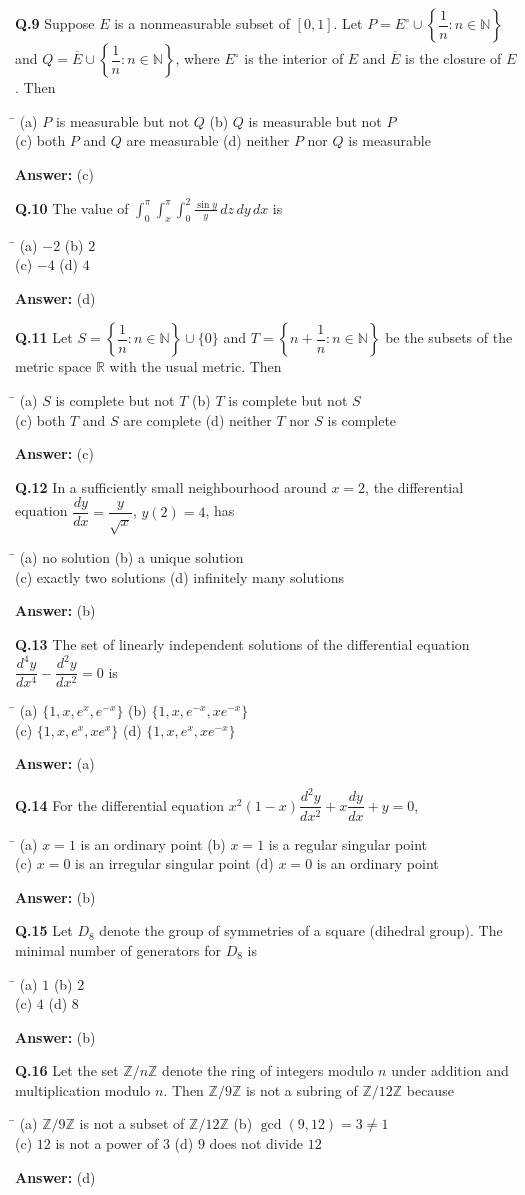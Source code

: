 \documentclass[11pt,a4paper]{article}
\newcommand{\optsfour}[4]{%
  \begin{tabbing}
    \hspace{0.48\linewidth}\=\kill
    (a) #1 \> (b) #2 \\[2pt]
    (c) #3 \> (d) #4
  \end{tabbing}%
}
\newcommand{\ans}[1]{\textbf{Answer:} #1\par\medskip}
\begin{document}
\textbf{Q.9} Suppose $E$ is a nonmeasurable subset of $[0, 1]$. Let $P = E^\circ \cup \left\{\dfrac{1}{n} : n \in \mathbb{N}\right\}$ and $Q = \overline{E} \cup \left\{\dfrac{1}{n} : n \in \mathbb{N}\right\}$, where $E^\circ$ is the interior of $E$ and $\overline{E}$ is the closure of $E$. Then
\optsfour{$P$ is measurable but not $Q$}{$Q$ is measurable but not $P$}{both $P$ and $Q$ are measurable}{neither $P$ nor $Q$ is measurable}
\ans{(c)}

\textbf{Q.10} The value of $\displaystyle\int_0^\pi \int_x^\pi \int_0^2 \frac{\sin y}{y}\,dz\,dy\,dx$ is
\optsfour{$-2$}{$2$}{$-4$}{$4$}
\ans{(d)}

\textbf{Q.11} Let $S = \left\{\dfrac{1}{n} : n \in \mathbb{N}\right\} \cup \{0\}$ and $T = \left\{n + \dfrac{1}{n} : n \in \mathbb{N}\right\}$ be the subsets of the metric space $\mathbb{R}$ with the usual metric. Then
\optsfour{$S$ is complete but not $T$}{$T$ is complete but not $S$}{both $T$ and $S$ are complete}{neither $T$ nor $S$ is complete}
\ans{(c)}

\textbf{Q.12} In a sufficiently small neighbourhood around $x = 2$, the differential equation $\dfrac{dy}{dx} = \dfrac{y}{\sqrt{x}}$, $y(2) = 4$, has
\optsfour{no solution}{a unique solution}{exactly two solutions}{infinitely many solutions}
\ans{(b)}

\textbf{Q.13} The set of linearly independent solutions of the differential equation $\dfrac{d^4 y}{dx^4} - \dfrac{d^2 y}{dx^2} = 0$ is
\optsfour{$\{1, x, e^x, e^{-x}\}$}{$\{1, x, e^{-x}, x e^{-x}\}$}{$\{1, x, e^x, x e^x\}$}{$\{1, x, e^x, x e^{-x}\}$}
\ans{(a)}

\textbf{Q.14} For the differential equation $x^2(1 - x)\dfrac{d^2 y}{dx^2} + x\dfrac{dy}{dx} + y = 0$,
\optsfour{$x = 1$ is an ordinary point}{$x = 1$ is a regular singular point}{$x = 0$ is an irregular singular point}{$x = 0$ is an ordinary point}
\ans{(b)}

\textbf{Q.15} Let $D_8$ denote the group of symmetries of a square (dihedral group). The minimal number of generators for $D_8$ is
\optsfour{$1$}{$2$}{$4$}{$8$}
\ans{(b)}

\textbf{Q.16} Let the set $\mathbb{Z}/n\mathbb{Z}$ denote the ring of integers modulo $n$ under addition and multiplication modulo $n$. Then $\mathbb{Z}/9\mathbb{Z}$ is not a subring of $\mathbb{Z}/12\mathbb{Z}$ because
\optsfour{$\mathbb{Z}/9\mathbb{Z}$ is not a subset of $\mathbb{Z}/12\mathbb{Z}$}{$\gcd(9, 12) = 3 \ne 1$}{$12$ is not a power of $3$}{$9$ does not divide $12$}
\ans{(d)}
\end{document}
